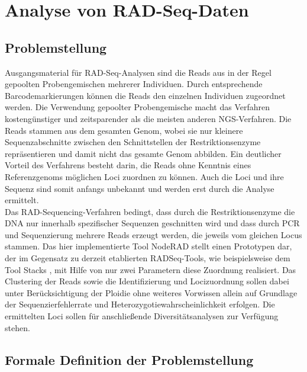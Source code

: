 \chapter{Analyse von RAD-Seq-Daten} \label{chapter:kap2}
\section{Problemstellung} \label{sec:probl}

Ausgangsmaterial für RAD-Seq-Analysen sind die Reads aus in der Regel gepoolten Probengemischen mehrerer Individuen. Durch entsprechende Barcodemarkierungen können die Reads den einzelnen Individuen zugeordnet werden. Die Verwendung gepoolter Probengemische macht das Verfahren kostengünstiger und zeitsparender als die meisten anderen NGS-Verfahren. Die Reads stammen aus dem gesamten Genom, wobei sie nur kleinere Sequenzabschnitte zwischen den Schnittstellen der Restriktionsenzyme repräsentieren und damit nicht das gesamte Genom abbilden. Ein deutlicher Vorteil des Verfahrens besteht darin, die Reads ohne Kenntnis eines Referenzgenoms möglichen Loci zuordnen zu können. Auch die Loci und ihre Sequenz sind somit anfangs unbekannt und werden erst durch die Analyse ermittelt.\\

Das RAD-Sequencing-Verfahren bedingt, dass durch die Restriktionsenzyme die DNA nur  innerhalb spezifischer Sequenzen geschnitten wird und dass durch PCR und Sequenzierung mehrere Reads erzeugt werden, die jeweils vom gleichen Locus stammen. Das hier implementierte Tool NodeRAD \cite{noderad} stellt einen Prototypen dar, der im Gegensatz zu derzeit etablierten RADSeq-Tools, wie beispielsweise dem Tool Stacks \cite{catchen_2013}, mit Hilfe von nur zwei Parametern diese Zuordnung realisiert. Das Clustering der Reads sowie die Identifizierung und Locizuordnung sollen dabei unter Berücksichtigung der Ploidie ohne weiteres Vorwissen allein auf Grundlage der Sequenzierfehlerrate und Heterozygotiewahrscheinlichkeit erfolgen. Die ermittelten Loci sollen für anschließende Diversitätsanalysen zur Verfügung stehen. 

\section{Formale Definition der Problemstellung} \label{sec:formal}

